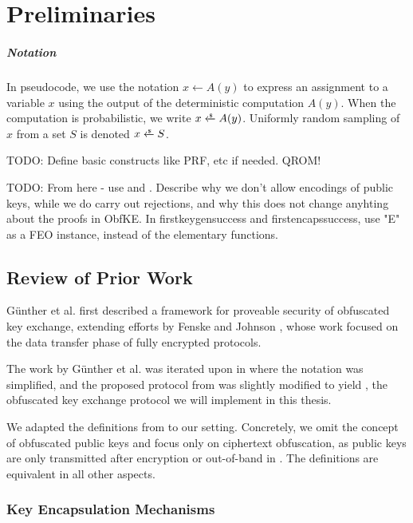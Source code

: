 \chapter{Preliminaries}\label{ch:preliminaries}

\paragraph{Notation}
In pseudocode, we use the notation $x \gets A(y)$ to express an assignment to a variable $x$ using the output of the deterministic computation $A(y)$. When the computation is probabilistic, we write $x \getsr A(y)$.
Uniformly random sampling of $x$ from a set $S$ is denoted $x \getsr S$.

TODO: Define basic constructs like PRF, etc if needed. QROM!

TODO: From here - use \firstkeygensuccess and \feo[KEM, E]. Describe why we don't allow encodings of public keys, while we do carry out rejections, and why this does not change anyhting about the proofs in ObfKE. In firstkeygensuccess and firstencapssuccess, use "E" as a FEO instance, instead of the elementary functions.

\section{Review of Prior Work} \label{sec:review-gsv24}

Günther et al. \cite{CCS:GunSteVei24} first described a framework for proveable security of obfuscated key exchange, extending efforts by Fenske and Johnson \cite{CCS:FenJoh24}, whose work focused on the data transfer phase of fully encrypted protocols.

The work by Günther et al. was iterated upon in \cite{EPRINT:GRSV25} where the notation was simplified, and the proposed protocol from \cite{CCS:GunSteVei24} was slightly modified to yield \drivel{}, the obfuscated key exchange protocol we will implement in this thesis.

We adapted the definitions from \cite{CCS:GunSteVei24,EPRINT:GRSV25} to our setting. Concretely, we omit the concept of obfuscated public keys and focus only on ciphertext obfuscation, as public keys are only transmitted after encryption or out-of-band in \drivel{}. The definitions are equivalent in all other aspects.

\subsection{Key Encapsulation Mechanisms}

